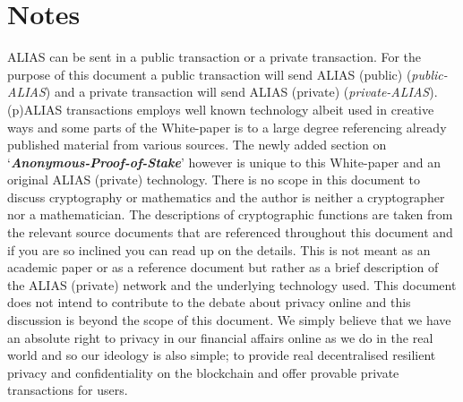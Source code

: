 \section{Notes}
ALIAS can be sent in a public transaction or a private transaction.
For the purpose of this document a public transaction will send ALIAS (public)
(\textit{public-ALIAS}) and a private transaction will send ALIAS (private) (\textit{private-ALIAS}). (p)ALIAS transactions employs well known
technology albeit used in creative ways and
some parts of the White-paper is to a large degree referencing already
published material from various sources. The newly added section on
‘\textbf{\textit{Anonymous-Proof-of-Stake}}’ however is unique to this
White-paper and an original ALIAS (private) technology. There is no scope in
this document to discuss cryptography or mathematics and the author is
neither a cryptographer nor a mathematician. The descriptions of cryptographic
functions are taken from the relevant source documents that are referenced
throughout this document and if you are so inclined you can read up on the
details. This is not meant as an academic paper or as a reference document
but rather as a brief description of the ALIAS (private) network and the
underlying technology used. This document does not intend to contribute
to the debate about privacy online and this discussion is beyond the scope
of this document. We simply believe that we have an absolute right to
privacy in our financial affairs online as we do in the real world and
so our ideology is also simple; to provide real decentralised resilient
privacy and confidentiality on the blockchain and offer provable private
transactions for users.
